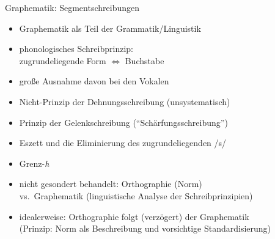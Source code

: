 \begin{frame}
  {Graphematik: Segmentschreibungen}
  \pause
  \begin{itemize}[<+->]
    \item Graphematik als Teil der Grammatik\slash Linguistik
      \Halbzeile
    \item \alert{phonologisches Schreibprinzip}:\\
      zugrundeliegende Form $\Leftrightarrow$ Buchstabe
    \item große Ausnahme davon bei den Vokalen 
      \Halbzeile
    \item Nicht-Prinzip der Dehnungsschreibung (unsystematisch)
    \item \alert{Prinzip der Gelenkschreibung} ("`Schärfungsschreibung"')
      \Halbzeile
    \item Eszett und die Eliminierung des zugrundeliegenden /s/
    \item Grenz-\textit{h}
      \Halbzeile
    \item nicht gesondert behandelt: \alert{Orthographie} (Norm)\\
      vs.\ \alert{Graphematik} (linguistische Analyse der Schreibprinzipien)
    \item idealerweise: Orthographie folgt (verzögert) der Graphematik\\
      (Prinzip: Norm als Beschreibung und vorsichtige Standardisierung)
  \end{itemize}
\end{frame}

